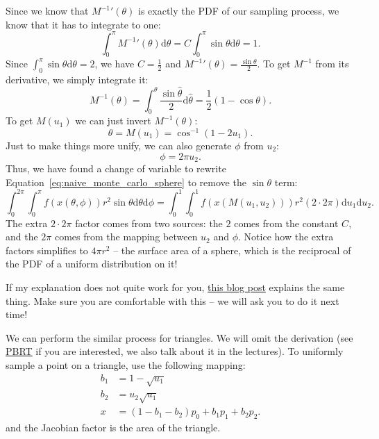 Since we know that ${M^{-1}}'(\theta)$ is exactly the PDF of our sampling process, we know that it has to integrate to one:
\begin{equation}
\int_{0}^{\pi} {M^{-1}}'(\theta) \mathrm{d}\theta = C\int_{0}^{\pi} \sin\theta \mathrm{d}\theta = 1.
\end{equation}
Since $\int_{0}^{\pi} \sin\theta \mathrm{d}\theta = 2$, we have $C = \frac{1}{2}$ and ${M^{-1}}'(\theta) = \frac{\sin\theta}{2}$. To get $M^{-1}$ from its derivative, we simply integrate it:
\begin{equation}
M^{-1}(\theta) = \int_{0}^{\theta} \frac{\sin\hat{\theta}}{2} \mathrm{d}\hat{\theta} = \frac{1}{2}\left(1 - \cos\theta\right).
\end{equation}
To get $M(u_1)$ we can just invert $M^{-1}(\theta)$:
\begin{equation}
\theta = M(u_1) = \cos^{-1}\left(1 - 2u_1\right).
\end{equation}
Just to make things more unify, we can also generate $\phi$ from $u_2$:
\begin{equation}
\phi = 2\pi u_2.
\end{equation}
Thus, we have found a change of variable to rewrite Equation~\eqref{eq:naive_monte_carlo_sphere} to remove the $\sin\theta$ term:
\begin{equation}
	\int_{0}^{2\pi}\int_{0}^{\pi} f(x(\theta, \phi)) r^2 \sin\theta \mathrm{d}\theta \mathrm{d} \phi =
	\int_{0}^{1}\int_{0}^{1} f(x(M(u_1, u_2))) r^2 (2 \cdot 2\pi) \mathrm{d}u_1 \mathrm{d}u_2.
	\label{eq:uniform_monte_carlo_sphere}
\end{equation}
The extra $2 \cdot 2\pi$ factor comes from two sources: the $2$ comes from the constant $C$, and the $2\pi$ comes from the mapping between $u_2$ and $\phi$. Notice how the extra factors simplifies to $4\pi r^2$ -- the surface area of a sphere, which is the reciprocal of the PDF of a uniform distribution on it!

If my explanation does not quite work for you, \href{http://6degreesoffreedom.co/circle-random-sampling/}{this blog post} explains the same thing. Make sure you are comfortable with this -- we will ask you to do it next time!

We can perform the similar process for triangles. We will omit the derivation (see \href{https://www.pbr-book.org/3ed-2018/Monte_Carlo_Integration/2D_Sampling_with_Multidimensional_Transformations#SamplingaTriangle}{PBRT} if you are interested, we also talk about it in the lectures). To uniformly sample a point on a triangle, use the following mapping:
\begin{equation}
\begin{aligned}
b_1 &= 1 - \sqrt{u_1} \\
b_2 &= u_2 \sqrt{u_1} \\
x &= (1 - b_1 - b_2) p_0 + b_1 p_1 + b_2 p_2.
\end{aligned}
\end{equation}
and the Jacobian factor is the area of the triangle.

